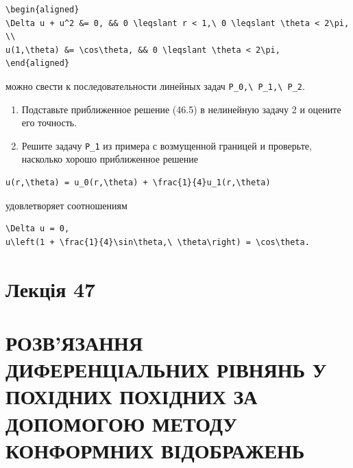 \documentclass[
  ukrainian,
]{article}
\begin{document}
\begin{verbatim}
\begin{aligned}
\Delta u + u^2 &= 0, && 0 \leqslant r < 1,\ 0 \leqslant \theta < 2\pi, \\
u(1,\theta) &= \cos\theta, && 0 \leqslant \theta < 2\pi,
\end{aligned}
\end{verbatim}

можно свести к последовательности линейных задач
\texttt{P\_0,\textbackslash{}\ P\_1,\textbackslash{}\ P\_2}.

\begin{enumerate}
\def\labelenumi{\arabic{enumi}.}
\setcounter{enumi}{2}
\item
  Подставьте приближенное решение (46.5) в нелинейную задачу 2 и оцените
  его точность.
\item
  Решите задачу \texttt{P\_1} из примера с возмущенной границей и
  проверьте, насколько хорошо приближенное решение
\end{enumerate}

\begin{verbatim}
u(r,\theta) = u_0(r,\theta) + \frac{1}{4}u_1(r,\theta)
\end{verbatim}

удовлетворяет соотношениям

\begin{verbatim}
\Delta u = 0,
u\left(1 + \frac{1}{4}\sin\theta,\ \theta\right) = \cos\theta.
\end{verbatim}

\section{Лекція 47}\label{ux43bux435ux43aux446ux456ux44f-47}

\section{РОЗВ'ЯЗАННЯ ДИФЕРЕНЦІАЛЬНИХ РІВНЯНЬ У ПОХІДНИХ ПОХІДНИХ ЗА
ДОПОМОГОЮ МЕТОДУ КОНФОРМНИХ
ВІДОБРАЖЕНЬ}\label{ux440ux43eux437ux432ux44fux437ux430ux43dux43dux44f-ux434ux438ux444ux435ux440ux435ux43dux446ux456ux430ux43bux44cux43dux438ux445-ux440ux456ux432ux43dux44fux43dux44c-ux443-ux43fux43eux445ux456ux434ux43dux438ux445-ux43fux43eux445ux456ux434ux43dux438ux445-ux437ux430-ux434ux43eux43fux43eux43cux43eux433ux43eux44e-ux43cux435ux442ux43eux434ux443-ux43aux43eux43dux444ux43eux440ux43cux43dux438ux445-ux432ux456ux434ux43eux431ux440ux430ux436ux435ux43dux44c}
\end{document}
